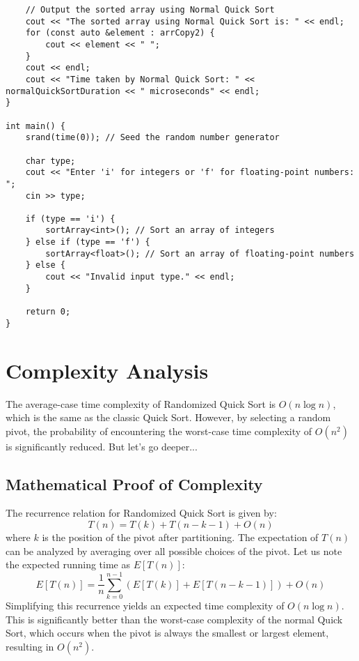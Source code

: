 \documentclass{article}
\begin{document}
\begin{lstlisting}
    // Output the sorted array using Normal Quick Sort
    cout << "The sorted array using Normal Quick Sort is: " << endl;
    for (const auto &element : arrCopy2) {
        cout << element << " ";
    }
    cout << endl;
    cout << "Time taken by Normal Quick Sort: " << normalQuickSortDuration << " microseconds" << endl;
}

int main() {
    srand(time(0)); // Seed the random number generator

    char type;
    cout << "Enter 'i' for integers or 'f' for floating-point numbers: ";
    cin >> type;

    if (type == 'i') {
        sortArray<int>(); // Sort an array of integers
    } else if (type == 'f') {
        sortArray<float>(); // Sort an array of floating-point numbers
    } else {
        cout << "Invalid input type." << endl;
    }

    return 0;
}
\end{lstlisting}

\section{Complexity Analysis}
The average-case time complexity of Randomized Quick Sort is $O(n \log n)$, which is the same as the classic Quick Sort. However, by selecting a random pivot, the probability of encountering the worst-case time complexity of $O(n^2)$ is significantly reduced.
But let's go deeper...
\subsection{Mathematical Proof of Complexity}
The recurrence relation for Randomized Quick Sort is given by:
\begin{equation}
    T(n) = T(k) + T(n - k - 1) + O(n)
\end{equation}
where $k$ is the position of the pivot after partitioning. The expectation of $T(n)$ can be analyzed by averaging over all possible choices of the pivot. Let us note the expected running time as $E[T(n)]$:
\begin{equation}
    E[T(n)] = \frac{1}{n} \sum_{k=0}^{n-1} \left( E[T(k)] + E[T(n - k - 1)] \right) + O(n)
\end{equation}
Simplifying this recurrence yields an expected time complexity of $O(n \log n)$. This is significantly better than the worst-case complexity of the normal Quick Sort, which occurs when the pivot is always the smallest or largest element, resulting in $O(n^2)$.
\end{document}
